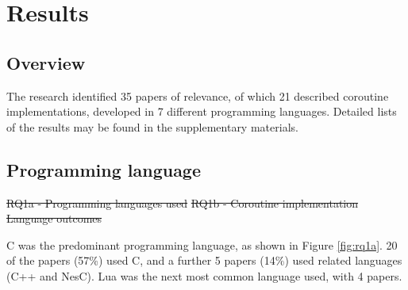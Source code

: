 \documentclass[format=acmsmall, review=false, screen=false]{acmart}
\providecommand{\DIFdel}[1]{{\protect\color{red}\sout{#1}}}                      %
\providecommand{\DIFdelbegin}{} %
\providecommand{\DIFdelend}{} %
\providecommand{\DIFdelFL}[1]{\DIFdel{#1}} %
\newcommand{\DIFscaledelfig}{0.5}
\newlength{\DIFdelgraphicswidth} %
\newlength{\DIFdelgraphicsheight} %
\newcommand{\DIFdelincludegraphics}[2][]{%
\sbox{\DIFdelgraphicsbox}{\DIFOincludegraphics[#1]{#2}}%
\settoboxwidth{\DIFdelgraphicswidth}{\DIFdelgraphicsbox} %
\settoboxtotalheight{\DIFdelgraphicsheight}{\DIFdelgraphicsbox} %
\scalebox{\DIFscaledelfig}{%
\parbox[b]{\DIFdelgraphicswidth}{\usebox{\DIFdelgraphicsbox}\\[-\baselineskip] \rule{\DIFdelgraphicswidth}{0em}}\llap{\resizebox{\DIFdelgraphicswidth}{\DIFdelgraphicsheight}{%
\setlength{\unitlength}{\DIFdelgraphicswidth}%
\begin{picture}(1,1)%
\thicklines\linethickness{2pt} %
{\color[rgb]{1,0,0}\put(0,0){\framebox(1,1){}}}%
{\color[rgb]{1,0,0}\put(0,0){\line( 1,1){1}}}%
{\color[rgb]{1,0,0}\put(0,1){\line(1,-1){1}}}%
\end{picture}%
}\hspace*{3pt}}} %
} %
\DeclareRobustCommand{\DIFdelbegin}{\DIFOdelbegin \let\includegraphics\DIFdelincludegraphics} %
\DeclareRobustCommand{\DIFdelend}{\DIFOaddend \let\includegraphics\DIFOincludegraphics} %
\begin{document}
\section{Results}
\label{section:results}

\subsection{Overview}

The research identified 35 papers of relevance, of which 21 described coroutine implementations, developed in 7 different programming languages. Detailed lists of the results may be found in the supplementary materials.

\subsection{Programming language}

\DIFdelbegin %
{%
\DIFdelFL{RQ1a - Programming languages used}}
{%
\DIFdelFL{RQ1b - Coroutine implementation}}
{%
\DIFdelFL{Language outcomes}}

\DIFdelend C was the predominant programming language, as shown in Figure \ref{fig:rq1a}. 20 of the papers (57\%) used C, and a further 5 papers (14\%) used related languages (C++ and NesC). Lua was the next most common language used, with 4 papers.
\end{document}
